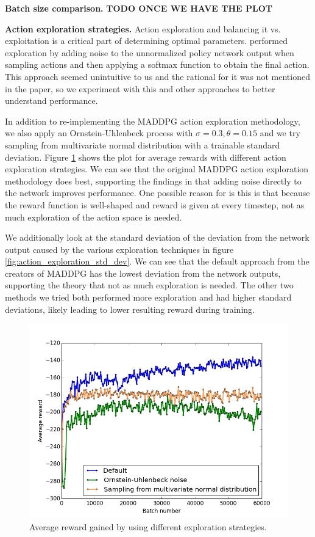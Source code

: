\documentclass{article}
\begin{document}
\textbf{Batch size comparison.} \textbf{TODO ONCE WE HAVE THE PLOT}

\textbf{Action exploration strategies.} Action exploration and balancing it vs. exploitation is a critical part of determining optimal parameters. \cite{maddpg} performed exploration by adding noise to the unnormalized policy network output when sampling actions and then applying a softmax function to obtain the final action. This approach seemed unintuitive to us and the rational for it was not mentioned in the paper, so we experiment with this and other approaches to better understand performance.

In addition to re-implementing the MADDPG action exploration methodology, we also apply an Ornstein-Uhlenbeck process with $\sigma = 0.3, \theta = 0.15$ and we try sampling from multivariate normal distribution with a trainable standard deviation. Figure \ref{fig:defaultVSouVSdist} shows the plot for average rewards with different action exploration strategies. We can see that the original MADDPG action exploration methodology does best, supporting the findings in \cite{plappert2017parameter} that adding noise directly to the network improves performance. One possible reason for is this is that because the reward function is well-shaped and reward is given at every timestep, not as much exploration of the action space is needed. 

We additionally look at the standard deviation of the deviation from the network output caused by the various exploration techniques in figure \ref{fig:action_exploration_std_dev}. We can see that the default approach from the creators of MADDPG has the lowest deviation from the network outputs, supporting the theory that not as much exploration is needed. The other two methods we tried both performed more exploration and had higher standard deviations, likely leading to lower resulting reward during training.

\begin{figure}
\begin{center}
\includegraphics[scale=0.35]{defaultVSouVSdist}
\end{center}
\caption{Average reward gained by using different exploration strategies.}
\label{fig:defaultVSouVSdist}
\end{figure}
\end{document}
